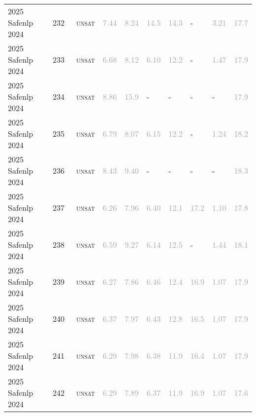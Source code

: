 \begin{center}
{\begin{longtable}{@{}llllllllll@{}}
2025 Safenlp 2024 & 232 & ~\textsc{unsat} & \textcolor{darkgray}{7.44} & \textcolor{darkgray}{8.24} & \textcolor{darkgray}{14.5} & \textcolor{darkgray}{14.3} & - & \textcolor{darkgray}{3.21} & \textcolor{darkgray}{17.7} \\
2025 Safenlp 2024 & 233 & ~\textsc{unsat} & \textcolor{darkgray}{6.68} & \textcolor{darkgray}{8.12} & \textcolor{darkgray}{6.10} & \textcolor{darkgray}{12.2} & - & \textcolor{darkgray}{1.47} & \textcolor{darkgray}{17.9} \\
2025 Safenlp 2024 & 234 & ~\textsc{unsat} & \textcolor{darkgray}{8.86} & \textcolor{darkgray}{15.9} & - & - & - & - & \textcolor{darkgray}{17.9} \\
2025 Safenlp 2024 & 235 & ~\textsc{unsat} & \textcolor{darkgray}{6.79} & \textcolor{darkgray}{8.07} & \textcolor{darkgray}{6.15} & \textcolor{darkgray}{12.2} & - & \textcolor{darkgray}{1.24} & \textcolor{darkgray}{18.2} \\
2025 Safenlp 2024 & 236 & ~\textsc{unsat} & \textcolor{darkgray}{8.43} & \textcolor{darkgray}{9.40} & - & - & - & - & \textcolor{darkgray}{18.3} \\
2025 Safenlp 2024 & 237 & ~\textsc{unsat} & \textcolor{darkgray}{6.26} & \textcolor{darkgray}{7.96} & \textcolor{darkgray}{6.40} & \textcolor{darkgray}{12.1} & \textcolor{darkgray}{17.2} & \textcolor{darkgray}{1.10} & \textcolor{darkgray}{17.8} \\
2025 Safenlp 2024 & 238 & ~\textsc{unsat} & \textcolor{darkgray}{6.59} & \textcolor{darkgray}{9.27} & \textcolor{darkgray}{6.14} & \textcolor{darkgray}{12.5} & - & \textcolor{darkgray}{1.44} & \textcolor{darkgray}{18.1} \\
2025 Safenlp 2024 & 239 & ~\textsc{unsat} & \textcolor{darkgray}{6.27} & \textcolor{darkgray}{7.86} & \textcolor{darkgray}{6.46} & \textcolor{darkgray}{12.4} & \textcolor{darkgray}{16.9} & \textcolor{darkgray}{1.07} & \textcolor{darkgray}{17.9} \\
2025 Safenlp 2024 & 240 & ~\textsc{unsat} & \textcolor{darkgray}{6.37} & \textcolor{darkgray}{7.97} & \textcolor{darkgray}{6.43} & \textcolor{darkgray}{12.8} & \textcolor{darkgray}{16.5} & \textcolor{darkgray}{1.07} & \textcolor{darkgray}{17.9} \\
2025 Safenlp 2024 & 241 & ~\textsc{unsat} & \textcolor{darkgray}{6.29} & \textcolor{darkgray}{7.98} & \textcolor{darkgray}{6.38} & \textcolor{darkgray}{11.9} & \textcolor{darkgray}{16.4} & \textcolor{darkgray}{1.07} & \textcolor{darkgray}{17.9} \\
2025 Safenlp 2024 & 242 & ~\textsc{unsat} & \textcolor{darkgray}{6.29} & \textcolor{darkgray}{7.89} & \textcolor{darkgray}{6.37} & \textcolor{darkgray}{11.9} & \textcolor{darkgray}{16.9} & \textcolor{darkgray}{1.07} & \textcolor{darkgray}{17.6} \\

\end{longtable}}
\end{center}
